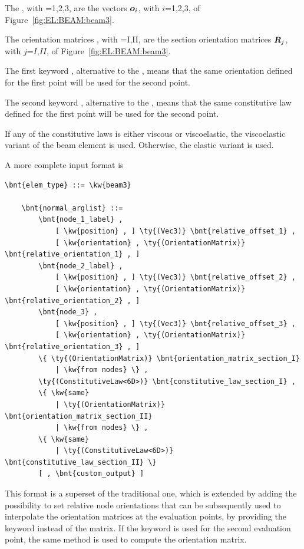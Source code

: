 The , with =1,2,3, are the vectors
$\boldsymbol{o}_i$, with $i$=1,2,3, of Figure~\ref{fig:EL:BEAM:beam3}.

The orientation matrices ,
with =I,II, are the section orientation matrices
$\boldsymbol{R}_j$, with $j$=$I$,$II$, of Figure~\ref{fig:EL:BEAM:beam3}.

The first keyword , alternative to the 
, means that the same orientation
defined for the first point will be used for the second point.

The second keyword , alternative to the
, means that the same constitutive law
defined for the first point will be used for the second point.

If any of the constitutive laws is either viscous or viscoelastic,
the viscoelastic variant of the beam element is used.
Otherwise, the elastic variant is used.

A more complete input format is
\begin{Verbatim}[commandchars=\\\{\}]
    \bnt{elem_type} ::= \kw{beam3}

    \bnt{normal_arglist} ::=
        \bnt{node_1_label} ,
            [ \kw{position} , ] \ty{(Vec3)} \bnt{relative_offset_1} ,
            [ \kw{orientation} , \ty{(OrientationMatrix)} \bnt{relative_orientation_1} , ]
        \bnt{node_2_label} ,
            [ \kw{position} , ] \ty{(Vec3)} \bnt{relative_offset_2} ,
            [ \kw{orientation} , \ty{(OrientationMatrix)} \bnt{relative_orientation_2} , ]
        \bnt{node_3} ,
            [ \kw{position} , ] \ty{(Vec3)} \bnt{relative_offset_3} ,
            [ \kw{orientation} , \ty{(OrientationMatrix)} \bnt{relative_orientation_3} , ]
        \{ \ty{(OrientationMatrix)} \bnt{orientation_matrix_section_I}
            | \kw{from nodes} \} ,
        \ty{(ConstitutiveLaw<6D>)} \bnt{constitutive_law_section_I} ,
        \{ \kw{same}
            | \ty{(OrientationMatrix)} \bnt{orientation_matrix_section_II}
            | \kw{from nodes} \} ,
        \{ \kw{same}
            | \ty{(ConstitutiveLaw<6D>)} \bnt{constitutive_law_section_II} \}
        [ , \bnt{custom_output} ]
\end{Verbatim}
This format is a superset of the traditional one, which is extended
by adding the possibility to set relative node orientations
that can be subsequently used to interpolate the orientation matrices
at the evaluation points, by providing the keyword 
instead of the matrix.
If the keyword  is used for the second evaluation point,
the same method is used to compute the orientation matrix.

